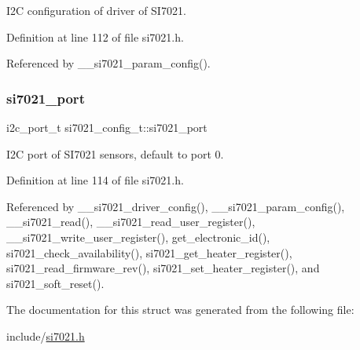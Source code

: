 I2C configuration of driver of S\+I7021. 

Definition at line 112 of file si7021.\+h.



Referenced by \+\_\+\+\_\+si7021\+\_\+param\+\_\+config().

\mbox{\label{structsi7021__config__t_ac3b2711d602d8210c52ec5d8680c827f}} 
\subsubsection{\texorpdfstring{si7021\+\_\+port}{si7021\_port}}
{\footnotesize\ttfamily i2c\+\_\+port\+\_\+t si7021\+\_\+config\+\_\+t\+::si7021\+\_\+port}

I2C port of S\+I7021 sensors, default to port 0. 

Definition at line 114 of file si7021.\+h.



Referenced by \+\_\+\+\_\+si7021\+\_\+driver\+\_\+config(), \+\_\+\+\_\+si7021\+\_\+param\+\_\+config(), \+\_\+\+\_\+si7021\+\_\+read(), \+\_\+\+\_\+si7021\+\_\+read\+\_\+user\+\_\+register(), \+\_\+\+\_\+si7021\+\_\+write\+\_\+user\+\_\+register(), get\+\_\+electronic\+\_\+id(), si7021\+\_\+check\+\_\+availability(), si7021\+\_\+get\+\_\+heater\+\_\+register(), si7021\+\_\+read\+\_\+firmware\+\_\+rev(), si7021\+\_\+set\+\_\+heater\+\_\+register(), and si7021\+\_\+soft\+\_\+reset().



The documentation for this struct was generated from the following file\+:\begin{DoxyCompactItemize}
\item 
include/\hyperlink{si7021_8h}{si7021.\+h}\end{DoxyCompactItemize}
